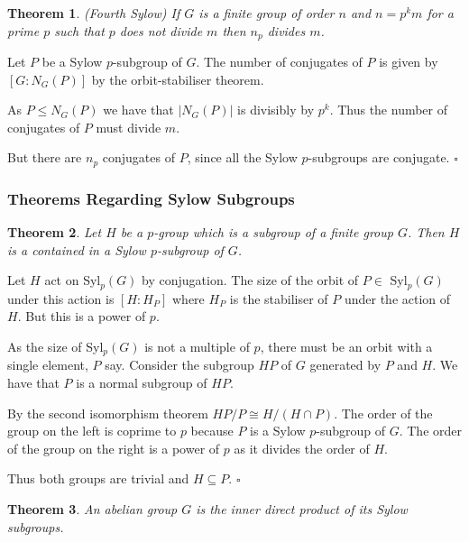 \documentclass[10pt]{article}
\newtheorem{theorem}{Theorem}[section]
\newenvironment{proof}[1][Proof]{\begin{trivlist}
\item[\hskip \labelsep {\itshape #1}]}{\end{trivlist}}
\begin{document}
\begin{theorem} (Fourth Sylow)
If $G$ is a finite group of order $n$ and $n = p^km$ for a prime $p$ such that $p$ does not divide $m$ then $n_p$ divides $m$.
\end{theorem}

\begin{proof}
Let $P$ be a Sylow $p$-subgroup of $G$. The number of conjugates of $P$ is given by $[G:N_G(P)]$ by the orbit-stabiliser theorem.

As $P \leq N_G(P)$ we have that $|N_G(P)|$ is divisibly by $p^k$. Thus the number of conjugates of $P$ must divide $m$.

But there are $n_p$ conjugates of $P$, since all the Sylow $p$-subgroups are conjugate. $\square$
\end{proof}

\subsubsection{Theorems Regarding Sylow Subgroups}

\begin{theorem}
Let $H$ be a $p$-group which is a subgroup of a finite group $G$. Then $H$ is a contained in a Sylow $p$-subgroup of $G$.
\end{theorem}

\begin{proof}
Let $H$ act on Syl$_p(G)$ by conjugation. The size of the orbit of $P \in$ Syl$_p(G)$ under this action is $[H:H_P]$ where $H_P$ is the stabiliser of $P$ under the action of $H$. But this is a power of $p$.

As the size of Syl$_p(G)$ is not a multiple of $p$, there must be an orbit with a single element, $P$ say. Consider the subgroup $HP$ of $G$ generated by $P$ and $H$. We have that $P$ is a normal subgroup of $HP$.

By the second isomorphism theorem $HP/P \cong H/(H\cap P)$. The order of the group on the left is coprime to $p$ because $P$ is a Sylow $p$-subgroup of $G$. The order of the group on the right is a power of $p$ as it divides the order of $H$. 

Thus both groups are trivial and $H \subseteq P$. $\square$
\end{proof}

\begin{theorem}
An abelian group $G$ is the inner direct product of its Sylow subgroups.
\end{theorem}
\end{document}
